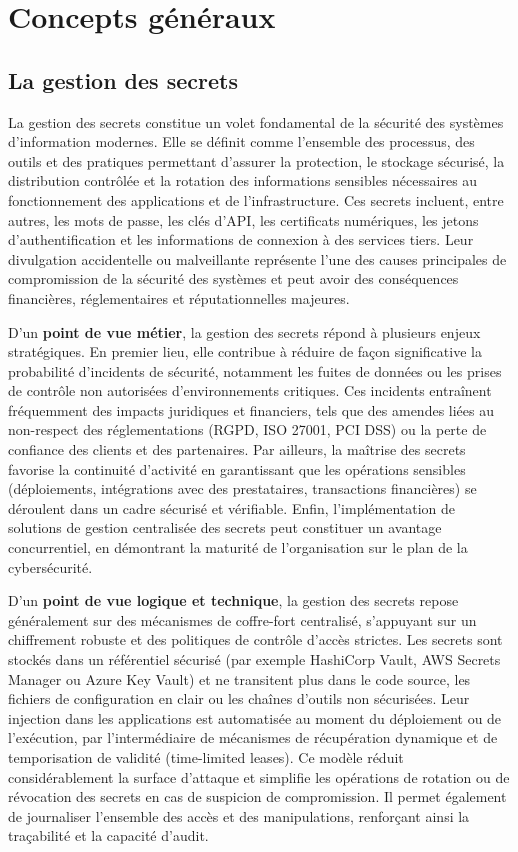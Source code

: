 \section{Concepts généraux}

\subsection{La gestion des secrets}

La gestion des secrets constitue un volet fondamental de la sécurité des systèmes d’information modernes. Elle se définit comme l’ensemble des processus, des outils et des pratiques permettant d’assurer la protection, le stockage sécurisé, la distribution contrôlée et la rotation des informations sensibles nécessaires au fonctionnement des applications et de l’infrastructure. Ces secrets incluent, entre autres, les mots de passe, les clés d’API, les certificats numériques, les jetons d’authentification et les informations de connexion à des services tiers. Leur divulgation accidentelle ou malveillante représente l’une des causes principales de compromission de la sécurité des systèmes et peut avoir des conséquences financières, réglementaires et réputationnelles majeures.

D’un \textbf{point de vue métier}, la gestion des secrets répond à plusieurs enjeux stratégiques. En premier lieu, elle contribue à réduire de façon significative la probabilité d’incidents de sécurité, notamment les fuites de données ou les prises de contrôle non autorisées d’environnements critiques. Ces incidents entraînent fréquemment des impacts juridiques et financiers, tels que des amendes liées au non-respect des réglementations (RGPD, ISO 27001, PCI DSS) ou la perte de confiance des clients et des partenaires. Par ailleurs, la maîtrise des secrets favorise la continuité d’activité en garantissant que les opérations sensibles (déploiements, intégrations avec des prestataires, transactions financières) se déroulent dans un cadre sécurisé et vérifiable. Enfin, l’implémentation de solutions de gestion centralisée des secrets peut constituer un avantage concurrentiel, en démontrant la maturité de l’organisation sur le plan de la cybersécurité.

D’un \textbf{point de vue logique et technique}, la gestion des secrets repose généralement sur des mécanismes de coffre-fort centralisé, s’appuyant sur un chiffrement robuste et des politiques de contrôle d’accès strictes. Les secrets sont stockés dans un référentiel sécurisé (par exemple HashiCorp Vault, AWS Secrets Manager ou Azure Key Vault) et ne transitent plus dans le code source, les fichiers de configuration en clair ou les chaînes d’outils non sécurisées. Leur injection dans les applications est automatisée au moment du déploiement ou de l’exécution, par l’intermédiaire de mécanismes de récupération dynamique et de temporisation de validité (time-limited leases). Ce modèle réduit considérablement la surface d’attaque et simplifie les opérations de rotation ou de révocation des secrets en cas de suspicion de compromission. Il permet également de journaliser l’ensemble des accès et des manipulations, renforçant ainsi la traçabilité et la capacité d’audit.


